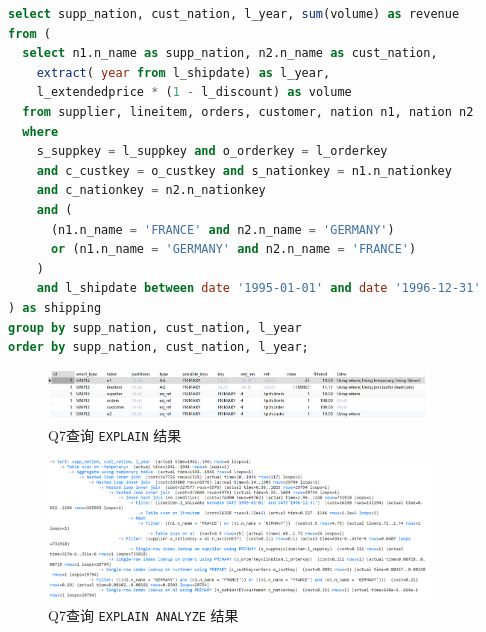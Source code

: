 \documentclass{article}
\renewcommand\tt{\texttt}
\begin{document}
\begin{enumerate}
\begin{lstlisting}[language=sql]
select supp_nation, cust_nation, l_year, sum(volume) as revenue 
from ( 
  select n1.n_name as supp_nation, n2.n_name as cust_nation, 
    extract( year from l_shipdate) as l_year, 
    l_extendedprice * (1 - l_discount) as volume 
  from supplier, lineitem, orders, customer, nation n1, nation n2 
  where
    s_suppkey = l_suppkey and o_orderkey = l_orderkey 
    and c_custkey = o_custkey and s_nationkey = n1.n_nationkey 
    and c_nationkey = n2.n_nationkey 
    and (
      (n1.n_name = 'FRANCE' and n2.n_name = 'GERMANY') 
      or (n1.n_name = 'GERMANY' and n2.n_name = 'FRANCE') 
    ) 
    and l_shipdate between date '1995-01-01' and date '1996-12-31' 
) as shipping 
group by supp_nation, cust_nation, l_year 
order by supp_nation, cust_nation, l_year;
\end{lstlisting}

\begin{figure}[H]
\centering
\includegraphics[width=0.9\textwidth]{img/13.png}
\caption{Q7查询 \tt{EXPLAIN} 结果}
\end{figure}

\begin{figure}[H]
\centering
\includegraphics[width=0.9\textwidth]{img/14.png}
\caption{Q7查询 \tt{EXPLAIN ANALYZE} 结果}
\end{figure}


\end{enumerate}
\end{document}
